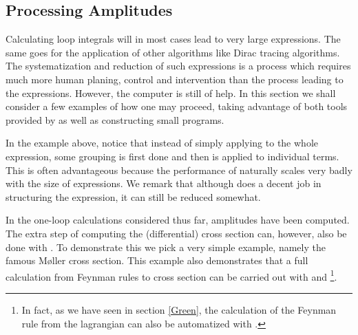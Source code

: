 \subsection{Processing Amplitudes}
\label{process}

Calculating loop integrals will in most cases lead to very large expressions. The same goes for the application of other algorithms like Dirac tracing algorithms. The systematization and reduction of such expressions is a process which requires much more human planing, control and intervention than the process leading to the expressions. However, the computer is still of help. In this section we shall consider a few examples of how one may proceed, taking advantage of both tools provided by \fc as well as constructing small \mma programs.

\beom
{}
\enom

In the example above, notice that instead of simply applying  to the whole expression, some grouping is first done and then  is applied to individual terms. This is often advantageous because the performance of  naturally scales very badly with the size of expressions. We remark that although  does a decent job in structuring the expression, it can still be reduced somewhat.

In the one-loop calculations considered thus far, amplitudes have been computed. The extra step of computing the (differential) cross section can, however, also be done with \fc. To demonstrate this we pick a very simple example, namely the famous M{\o}ller cross section. This example also demonstrates that a full calculation from Feynman rules to cross section can be carried out with \fa and \fc \footnote{In fact, as we have seen in section \ref{Green}, the calculation of the Feynman rule from the lagrangian can also be automatized with \fc.}.


